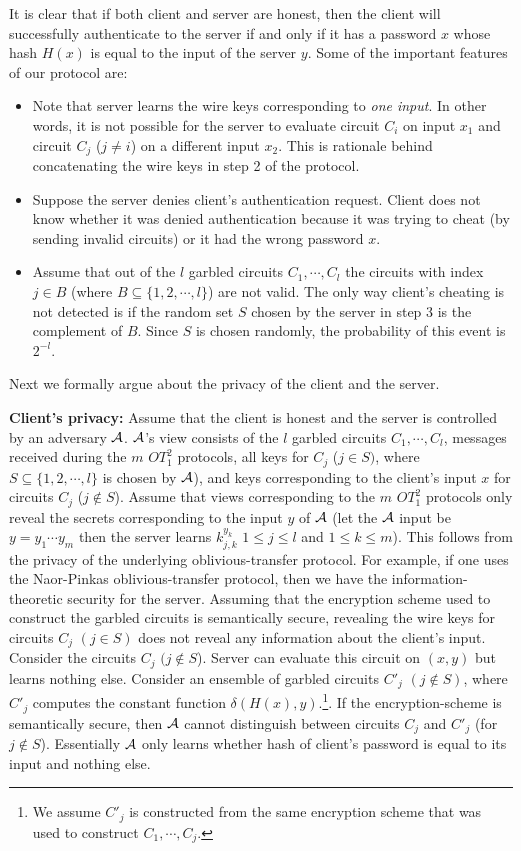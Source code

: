 \documentclass[12pt]{article}
\begin{document}
It is clear that if both client and server are honest, then the client
will successfully authenticate to the server if and only if it has a
password $x$ whose hash $H(x)$ is equal to the input of the server
$y$. Some of the important features of our protocol are:
\begin{itemize}
\item Note that server learns the wire keys corresponding to {\it one input}.
In other words, it is not possible for the server to evaluate circuit $C_i$
on input $x_1$ and circuit $C_j$ ($j \not= i$) on a different input $x_2$.
This is rationale behind concatenating the wire keys in step 2 of the protocol.

\item Suppose the server denies client's authentication request. Client does
not know whether it was denied authentication because it was trying to cheat (by
sending invalid circuits) or it had the wrong password $x$.

\item Assume that out of the $l$ garbled circuits $C_1, \cdots , C_l$ the
circuits with index $j \in B$ (where $B \subseteq \{ 1,2, \cdots ,
l\}$) are not valid. The only way client's cheating is not detected is
if the random set $S$ chosen by the server in step 3 is the complement
of $B$. Since $S$ is chosen randomly, the probability of this event is
$2^{-l}$.
\end{itemize}

Next we formally argue about the privacy of the client and the server.

\noindent
{\bf Client's privacy:} Assume that the client is honest and the
server is controlled by an adversary ${\cal A}$.  ${\cal A}$'s view
consists of the $l$ garbled circuits $C_1,\cdots,C_l$, messages
received during the $m$ $OT_1^2$ protocols, all keys for $C_j$ ($j \in
S )$, where $S \subseteq \{ 1,2, \cdots, l \}$ is chosen by ${\cal
A}$), and keys corresponding to the client's input $x$ for circuits
$C_j$ ($j \not\in S$). Assume that views corresponding to the $m$
$OT_1^2$ protocols only reveal the secrets corresponding to the input
$y$ of ${\cal A}$ (let the ${\cal A}$ input be $y = y_1 \cdots y_m$
then the server learns $k^{y_k}_{j,k}$ $1 \leq j \leq l$ and $1 \leq k
\leq m$). This follows from the privacy of the underlying
oblivious-transfer protocol. For example, if one uses the Naor-Pinkas
oblivious-transfer protocol, then we have the information-theoretic security
for the server. Assuming that the encryption scheme used
to construct the garbled circuits is semantically secure, revealing
the wire keys for circuits $C_j$ $(j \in S)$ does not reveal any
information about the client's input. Consider the circuits $C_j$ $(j
\not\in S$). Server can evaluate this circuit on $(x,y)$ but learns
nothing else. Consider an ensemble of garbled circuits $C'_j$ $(j
\not\in S)$, 
where $C'_j$ computes the constant function $\delta (H(x),y)$.\footnote{ We assume $C'_j$ is constructed from the same
encryption scheme that was used to construct $C_1,\cdots,C_j$.}. If
the encryption-scheme is semantically secure, then ${\cal A}$ cannot
distinguish between circuits $C_j$ and $C'_j$ (for $j \not\in
S$). Essentially ${\cal A}$ only learns whether hash of client's
password is equal to its input and nothing else.
\end{document}
